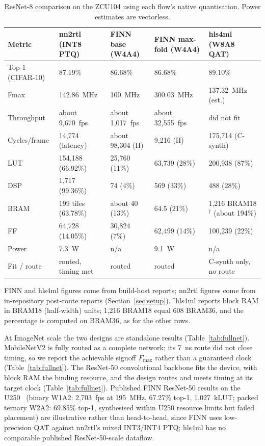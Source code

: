 \documentclass[acmtog,authorversion]{acmart}
\begin{document}
\begin{table}[t]
\centering
\caption{ResNet-8 comparison on the ZCU104 using each flow's native quantisation. Power estimates are vectorless.}
\label{tab:resnet8}
\begin{tabular}{@{}p{}p{}p{}p{}p{}@{}}
\toprule
Metric & nn2rtl (INT8 PTQ) & FINN base (W4A4) & FINN max-fold (W4A4) & hls4ml (W8A8 QAT) \\
\midrule
Top-1 (CIFAR-10) & 87.19\% & 86.68\% & 86.68\% & 89.10\% \\
Fmax & 142.86~MHz & 100~MHz & 300.03~MHz & 137.32~MHz (est.) \\
Throughput & about 9,670~fps & about 1,017~fps & about 32,555~fps & did not fit \\
Cycles/frame & 14,774 (latency) & about 98,304 (II) & 9,216 (II) & 175,714 (C-synth) \\
LUT & 154,188 (66.92\%) & 25,760 (11\%) & 63,739 (28\%) & 200,938 (87\%) \\
DSP & 1,717 (99.36\%) & 74 (4\%) & 569 (33\%) & 488 (28\%) \\
BRAM & 199 tiles (63.78\%) & about 40 (13\%) & 64.5 (21\%) & 1,216 BRAM18$^{\dagger}$ (about 194\%) \\
FF & 64,728 (14.05\%) & 30,824 (7\%) & 62,499 (14\%) & 100,239 (22\%) \\
Power & 7.3~W & n/a & 9.1~W & n/a \\
Fit / route & routed, timing met & routed & routed & C-synth only, no route \\
\bottomrule
\end{tabular}
\vspace{2pt}
\begin{minipage}{0.97\textwidth}
FINN and hls4ml figures come from build-host reports; nn2rtl figures come from in-repository post-route reports (Section~\ref{sec:setup}). $^{\dagger}$hls4ml reports block RAM in BRAM18 (half-width) units; 1,216 BRAM18 equal 608 BRAM36, and the percentage is computed on BRAM36, as for the other rows.
\end{minipage}
\end{table}

At ImageNet scale the two designs are standalone results (Table~\ref{tab:fullnet}). MobileNetV2 is fully routed as a complete network; its 7~ns route did not close timing, so we report the achievable signoff $F_{\max}$ rather than a guaranteed clock (Table~\ref{tab:fullnet}). The ResNet-50 convolutional backbone fits the device, with block RAM the binding resource, and the design routes and meets timing at its target clock (Table~\ref{tab:fullnet}). Published FINN ResNet-50 results on the U250~\cite{petrica2020} (binary W1A2: 2,703~fps at 195~MHz, 67.27\% top-1, 1,027~kLUT; packed ternary W2A2: 69.85\% top-1, synthesised within U250 resource limits but failed placement) are illustrative rather than head-to-head, since FINN uses low-precision QAT against nn2rtl's mixed INT3/INT4 PTQ; hls4ml has no comparable published ResNet-50-scale dataflow.
\end{document}

